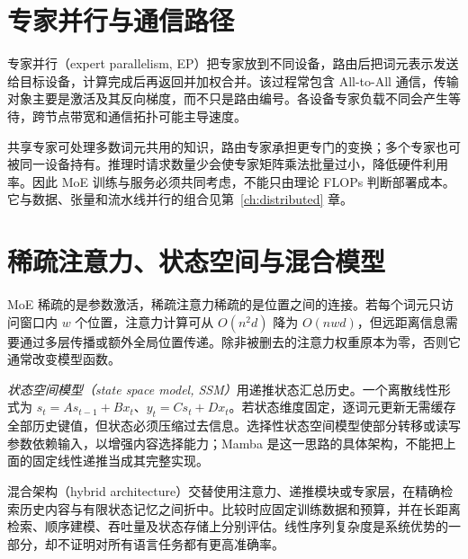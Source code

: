 \section{专家并行与通信路径}

专家并行（expert parallelism, EP）把专家放到不同设备，路由后把词元表示发送给目标设备，计算完成后再返回并加权合并。该过程常包含 All-to-All 通信，传输对象主要是激活及其反向梯度，而不只是路由编号。各设备专家负载不同会产生等待，跨节点带宽和通信拓扑可能主导速度。

共享专家可处理多数词元共用的知识，路由专家承担更专门的变换；多个专家也可被同一设备持有。推理时请求数量少会使专家矩阵乘法批量过小，降低硬件利用率。因此 MoE 训练与服务必须共同考虑，不能只由理论 FLOPs 判断部署成本。它与数据、张量和流水线并行的组合见第~\ref{ch:distributed} 章。

\section{稀疏注意力、状态空间与混合模型}

MoE 稀疏的是参数激活，稀疏注意力稀疏的是位置之间的连接。若每个词元只访问窗口内 $w$ 个位置，注意力计算可从 $O(n^2d)$ 降为 $O(nwd)$，但远距离信息需要通过多层传播或额外全局位置传递。除非被删去的注意力权重原本为零，否则它通常改变模型函数。

\emph{状态空间模型（state space model, SSM）}用递推状态汇总历史。一个离散线性形式为 $s_t=As_{t-1}+Bx_t$、$y_t=Cs_t+Dx_t$。若状态维度固定，逐词元更新无需缓存全部历史键值，但状态必须压缩过去信息。选择性状态空间模型使部分转移或读写参数依赖输入，以增强内容选择能力；Mamba 是这一思路的具体架构\cite{mamba}，不能把上面的固定线性递推当成其完整实现。

混合架构（hybrid architecture）交替使用注意力、递推模块或专家层，在精确检索历史内容与有限状态记忆之间折中。比较时应固定训练数据和预算，并在长距离检索、顺序建模、吞吐量及状态存储上分别评估。线性序列复杂度是系统优势的一部分，却不证明对所有语言任务都有更高准确率。

